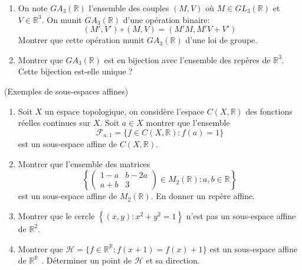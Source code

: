 \documentclass[a4paper,12pt,reqno]{amsart}
\begin{document}
\begin{exo}
\begin{enumerate}
    \item\hard On note $GA_{3}(\mathbb{R})$ l'ensemble des couples $(M,V)$ où $M\in GL_{3}(\mathbb{R})$ et $V\in\mathbb{R}^{3}$. On munit $GA_{3}(\mathbb{R})$ d'une opération binaire:\vspace{-3mm}
      \[
        (M',V')\circ(M,V)=(M'M,M'V+V')
      \]
    Montrer que cette opération munit $GA_{3}(\mathbb{R})$ d'une loi de groupe.

    \item\hard Montrer que $GA_{3}(\mathbb{R})$ est en bijection avec l'ensemble des repères de $\mathbb{R}^{3}$. \\
    Cette bijection est-elle unique ?
  \end{enumerate}
\end{exo}

\begin{exo} (Exemples de sous-espaces affines)
  \begin{enumerate}

  \item Soit $X$ un espace topologique, on considère l'espace $C(X,\mathbb{R})$ des fonctions réelles continues sur $X$. Soit $a \in X$ montrer que l'ensemble
    \[
      \mathcal{F}_{a,1}=\{ f \in C(X,\mathbb{R}) : f(a)=1 \}
    \]
  est un sous-espace affine de $C(X,\mathbb{R})$.

  \item Montrer que l'ensemble des matrices
    \[
      \left\{
        \left(
          \begin{array}{cc}
            1-a & b-2a\\
            a+b & 3
          \end{array}
        \right) \in M_{2}(\mathbb{R})
        : a,b \in \mathbb{R}
      \right\}
    \]
  est un sous-espace affine de $M_{2}(\mathbb{R})$. En donner un repère affine.

  \item Montrer que le cercle $\left\{ (x,y) : x^{2}+y^{2} = 1 \right\} $ n'est
  pas un sous-espace affine de $\mathbb{R}^{2}$.

  \item Montrer que $\mathcal{H} = \{ f \in \mathbb{R}^{\mathbb{R}} : f(x+1)=f(x)+1\}$
  est un sous-espace affine de $\mathbb{R}^{\mathbb{R}}$ . Déterminer
  un point de $\mathcal{H}$ et sa direction.
  \end{enumerate}
\end{exo}
\end{document}
